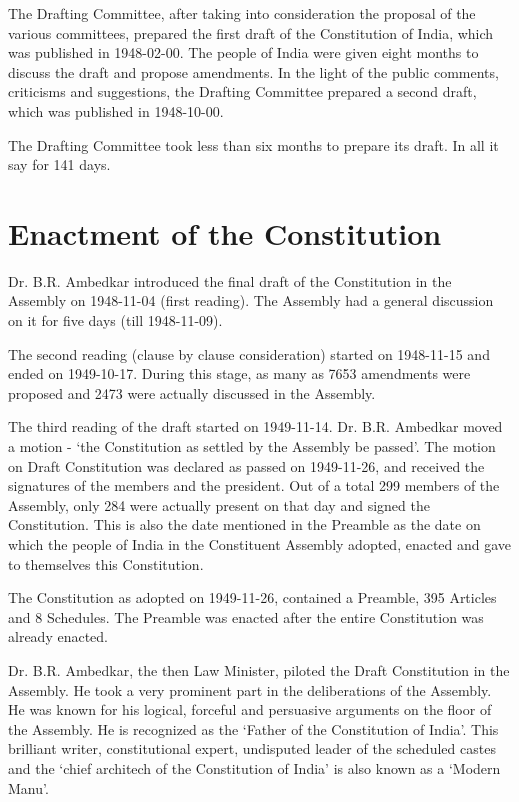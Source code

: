 \begin{multicol}{2}
The Drafting Committee, after taking into consideration the proposal of the various committees, prepared the first draft of the Constitution of India, which was published in 1948-02-00. The people of India were given eight months to discuss the draft and propose amendments. In the light of the public comments, criticisms and suggestions, the Drafting Committee prepared a second draft, which was published in 1948-10-00.

The Drafting Committee took less than six months to prepare its draft. In all it say for 141 days.

\section{Enactment of the Constitution}

Dr. B.R. Ambedkar introduced the final draft of the Constitution in the Assembly on 1948-11-04 (first reading). The Assembly had a general discussion on it for five days (till 1948-11-09).

The second reading (clause by clause consideration) started on 1948-11-15 and ended on 1949-10-17. During this stage, as many as 7653 amendments were proposed and 2473 were actually discussed in the Assembly.

The third reading of the draft started on 1949-11-14. Dr. B.R. Ambedkar moved a motion - `the Constitution as settled by the Assembly be passed'. The motion on Draft Constitution was declared as passed on 1949-11-26, and received the signatures of the members and the president. Out of a total 299 members of the Assembly, only 284 were actually present on that day and signed the Constitution. This is also the date mentioned in the Preamble as the date on which the people of India in the Constituent Assembly adopted, enacted and gave to themselves this Constitution.

{ The Constitution as adopted on 1949-11-26, contained a Preamble, 395 Articles and 8 Schedules}. The Preamble was enacted after the entire Constitution was already enacted.

Dr. B.R. Ambedkar, the then Law Minister, piloted the Draft Constitution in the Assembly. He took a very prominent part in the deliberations of the Assembly. He was known for his logical, forceful and persuasive arguments on the floor of the Assembly. He is recognized as the `Father of the Constitution of India'. This brilliant writer, constitutional expert, undisputed leader of the scheduled castes and the `chief architech of the Constitution of India' is also known as a `Modern Manu'.


\end{multicol}
